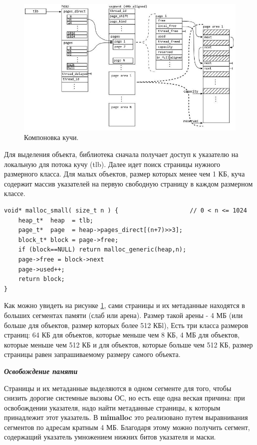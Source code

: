 \begin{figure}[!h]
	\begin{center}
		\includegraphics[scale=0.8]{images/mimalloc-design-overview.jpg}
		\caption{Компоновка кучи.}
		\label{mimalloc-design-overview}
	\end{center}
\end{figure}

Для выделения объекта, библиотека сначала получает доступ к указателю на локальную для потока кучу (tlb). Далее идет поиск страницы нужного размерного класса. Для малых объектов, размер которых менее чем 1 КБ, куча содержит массив указателей на первую свободную страницу в каждом размерном классе.

\pagebreak

\begin{lstlisting}
void* malloc_small( size_t n ) {                    // 0 < n <= 1024
	heap_t*  heap  = tlb;
	page_t*  page  = heap->pages_direct[(n+7)>>3];
	block_t* block = page->free;
	if (block==NULL) return malloc_generic(heap,n);
	page->free = block->next
	page->used++;
	return block;
}
\end{lstlisting}

Как можно увидеть на рисунке \ref{mimalloc-design-overview}, сами страницы и их метаданные находятся в больших сегментах памяти (слаб или арена). Размер такой арены - 4 МБ (или больше для объектов, размер которых более 512 КБl), Есть три класса размеров страниц: 64 КБ для объектов, которые меньше чем 8 КБ, 4 МБ для объектов, которые меньше чем 512 КБ и для объектов, которые больше чем 512 КБ, размер страницы равен запрашиваемому размеру самого объекта.

\bigbreak
\textit{\textbf{Освобождение памяти}}

Страницы и их метаданные выделяются в одном сегменте для того, чтобы снизить дорогие системные вызовы ОС, но есть еще одна веская причина: при освобождении указателя, надо найти метаданные страницы, к которым принадлежит этот указатель. В \textbf{mimalloc} это реализовано путем выравнивания сегментов по адресам кратным 4 МБ. Благодаря этому можно получить сегмент, содержащий указатель умножением нижних битов указателя и маски.

